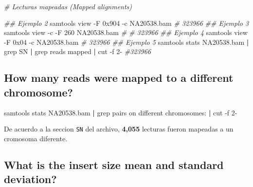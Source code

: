 \documentclass[
]{article}
\newenvironment{Shaded}{\begin{snugshade}}{\end{snugshade}}
\newcommand{\AttributeTok}[1]{\textcolor[rgb]{0.77,0.63,0.00}{#1}}
\newcommand{\CommentTok}[1]{\textcolor[rgb]{0.56,0.35,0.01}{\textit{#1}}}
\newcommand{\ExtensionTok}[1]{#1}
\newcommand{\FunctionTok}[1]{\textcolor[rgb]{0.00,0.00,0.00}{#1}}
\newcommand{\KeywordTok}[1]{\textcolor[rgb]{0.13,0.29,0.53}{\textbf{#1}}}
\newcommand{\NormalTok}[1]{#1}
\newcommand{\StringTok}[1]{\textcolor[rgb]{0.31,0.60,0.02}{#1}}
\begin{document}
\begin{Shaded}
\begin{Highlighting}[]
\CommentTok{\# Lecturas mapeadas (Mapped alignments)}

\CommentTok{\#\# Ejemplo 2}
\ExtensionTok{samtools}\NormalTok{ view }\AttributeTok{{-}F}\NormalTok{ 0x904 }\AttributeTok{{-}c}\NormalTok{ NA20538.bam }\CommentTok{\# 323966}
\CommentTok{\#\# Ejemplo 3}
\ExtensionTok{samtools}\NormalTok{ view }\AttributeTok{{-}c} \AttributeTok{{-}F}\NormalTok{ 260 NA20538.bam }\CommentTok{\# \# 323966}
\CommentTok{\#\# Ejemplo 4}
\ExtensionTok{samtools}\NormalTok{ view }\AttributeTok{{-}F}\NormalTok{ 0x04 }\AttributeTok{{-}c}\NormalTok{ NA20538.bam }\CommentTok{\# 323966}
\CommentTok{\#\# Ejemplo 5}
\ExtensionTok{samtools}\NormalTok{ stats NA20538.bam }\KeywordTok{|} \FunctionTok{grep} \StringTok{\textquotesingle{}SN\textquotesingle{}} \KeywordTok{|} \FunctionTok{grep} \StringTok{\textquotesingle{}reads mapped\textquotesingle{}} \KeywordTok{|} \FunctionTok{cut} \AttributeTok{{-}f}\NormalTok{ 2{-} }\CommentTok{\#323966}
\end{Highlighting}
\end{Shaded}

\hypertarget{how-many-reads-were-mapped-to-a-different-chromosome}{%
\subsection{How many reads were mapped to a different
chromosome?}\label{how-many-reads-were-mapped-to-a-different-chromosome}}

\begin{Shaded}
\begin{Highlighting}[]
\ExtensionTok{samtools}\NormalTok{ stats NA20538.bam }\KeywordTok{|} \FunctionTok{grep} \StringTok{\textquotesingle{}pairs on different chromosomes:\textquotesingle{}} \KeywordTok{|} \FunctionTok{cut} \AttributeTok{{-}f}\NormalTok{ 2{-}}
\end{Highlighting}
\end{Shaded}

De acuerdo a la seccion \texttt{SN} del archivo, \textbf{4,055} lecturas
fueron mapeadas a un cromosoma diferente.

\hypertarget{what-is-the-insert-size-mean-and-standard-deviation}{%
\subsection{What is the insert size mean and standard
deviation?}\label{what-is-the-insert-size-mean-and-standard-deviation}}
\end{document}
